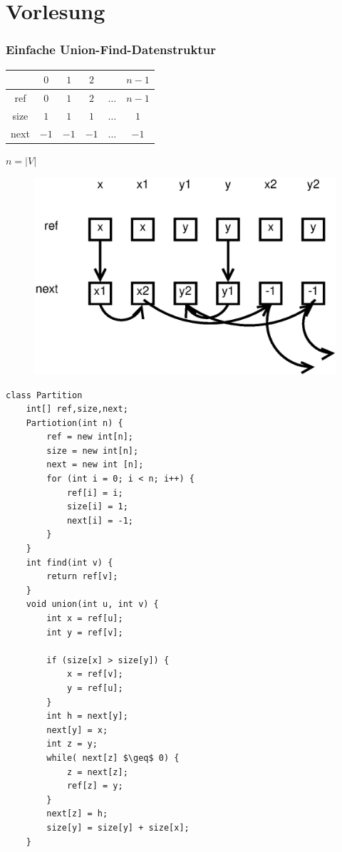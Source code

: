 \chapter{Vorlesung}
\subsection{Einfache Union-Find-Datenstruktur}
\begin{tabular}{c|c|c|c|c|c|}
	    &$0$&$1$&$2$&        &$n-1$\\ \hline
	ref &$0$&$1$&$2$&$\ldots$&$n-1$\\ \hline
	size&$1$&$1$&$1$&$\ldots$&  $1$\\ \hline
	next&$-1$&$-1$&$-1$&$\ldots$&$-1$\\ \hline	
\end{tabular}
$n=|V|$\\

\begin{figure}
	\vspace{200pt}
	\centering
	\includegraphics[width=\linewidth]{20/Grafik/img1}
\end{figure}
\begin{lstlisting}
class Partition
	int[] ref,size,next;
	Partiotion(int n) {
		ref = new int[n];
		size = new int[n];
		next = new int [n];
		for (int i = 0; i < n; i++) {
			ref[i] = i;
			size[i] = 1;
			next[i] = -1;
		}
	}
	int find(int v) {
		return ref[v];
	}
	void union(int u, int v) {
		int x = ref[u];
		int y = ref[v];
		
		if (size[x] > size[y]) {
			x = ref[v];
			y = ref[u];
		}
		int h = next[y];
		next[y] = x;
		int z = y;
		while( next[z] $\geq$ 0) {
			z = next[z];
			ref[z] = y;
		}
		next[z] = h;
		size[y] = size[y] + size[x];
	}
\end{lstlisting}

